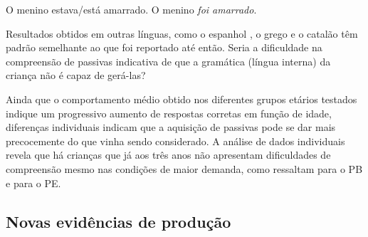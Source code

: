 \documentclass[output=paper]{LSP/langsci}
\begin{document}
\ea\label{ex:correapassiva_27}
O menino estava/está amarrado.
\z
\ea\label{ex:correapassiva_28}
O menino \textit{foi amarrado}.
\z

Resultados obtidos em outras línguas, como o espanhol \citep{pierce1992}, o grego \citep{terziexler2002} e o catalão \citep{chocarro2009} têm padrão semelhante ao que foi reportado até então. Seria a dificuldade na compreensão de passivas indicativa de que a gramática (língua interna) da criança não é capaz de gerá-las?

Ainda que o comportamento médio obtido nos diferentes grupos etários testados indique um progressivo aumento de respostas corretas em função de idade, diferenças individuais indicam que a aquisição de passivas pode se dar mais precocemente do que vinha sendo considerado. A análise de dados individuais revela que há crianças que já aos três anos não apresentam dificuldades de compreensão mesmo nas condições de maior demanda, como ressaltam \citet{rubin2009} para o PB e \citet{estrela2013} para o PE.

\subsection{Novas evidências de produção}
\label{subsec:correapassiva_novas_evidencias}
\end{document}
